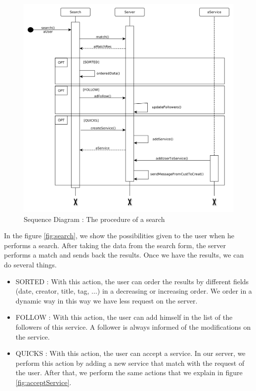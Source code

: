 \begin{figure}[H]
	\begin{center}
		\includegraphics[width=.95\textwidth]{seq_search.png}
		\caption{Sequence Diagram : The procedure of a search}
		\label{fig:search}
	\end{center}
\end{figure}

In the figure \vref{fig:search}, we show the possibilities given to the user when he performs a search. After taking the data from the search form, the server performs a match and sends back the results.
Once we have the results, we can do several things.
\begin{itemize}
	\item \textsc{SORTED} : With this action, the user can order the results by different fields (date, creator, title, tag, ...)  in a decreasing or increasing order. We order in a dynamic way in this way we have less request on the server.
    \item \textsc{FOLLOW} : With this action, the user can add himself in the list of the followers of this service. A follower is always informed of the modifications on the service.
    \item \textsc{QUICKS} : With this action, the user can accept a service.  In our server, we perform this action by adding a new service that match with the request of the user.  After that, we perform the same actions that we explain in figure \vref{fig:acceptService}.
\end{itemize}

